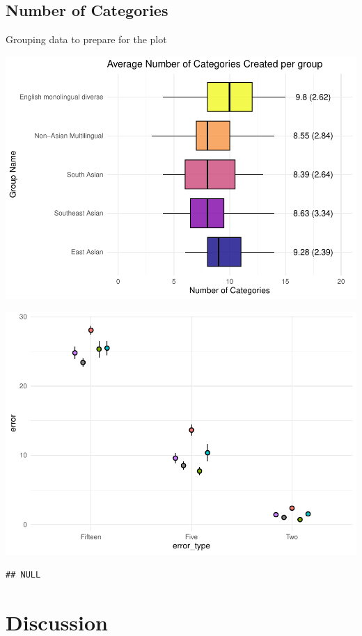 \documentclass[
  man]{apa6}
\begin{document}
\subsection{Number of Categories}\label{number-of-categories}

Grouping data to prepare for the plot

\includegraphics{DE3_papaja_files/figure-latex/unnamed-chunk-2-1.pdf}

\includegraphics{DE3_papaja_files/figure-latex/unnamed-chunk-4-1.pdf}

\begin{verbatim}
## NULL
\end{verbatim}

\section{Discussion}\label{discussion}
\end{document}
